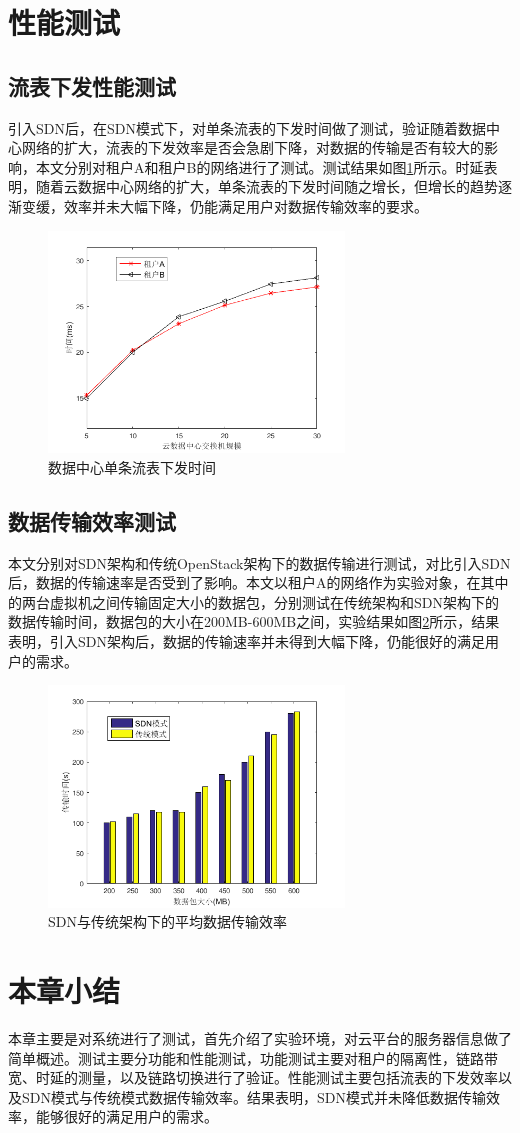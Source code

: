 \section{性能测试}
\subsection{流表下发性能测试}
引入SDN后，在SDN模式下，对单条流表的下发时间做了测试，验证随着数据中心网络的扩大，流表的下发效率是否会急剧下降，对数据的传输是否有较大的影响，本文分别对租户A和租户B的网络进行了测试。测试结果如图\ref{fig:flow-time}所示。时延表明，随着云数据中心网络的扩大，单条流表的下发时间随之增长，但增长的趋势逐渐变缓，效率并未大幅下降，仍能满足用户对数据传输效率的要求。

\begin{figure}[!htb]
  \centering
  \includegraphics[width=0.7\textwidth,height=0.40\textwidth]{logo/flow-time}
  \caption{数据中心单条流表下发时间}
  \label{fig:flow-time}
\end{figure}
\subsection{数据传输效率测试}
本文分别对SDN架构和传统OpenStack架构下的数据传输进行测试，对比引入SDN后，数据的传输速率是否受到了影响。本文以租户A的网络作为实验对象，在其中的两台虚拟机之间传输固定大小的数据包，分别测试在传统架构和SDN架构下的数据传输时间，数据包的大小在200MB-600MB之间，实验结果如图\ref{fig:transmission}所示，结果表明，引入SDN架构后，数据的传输速率并未得到大幅下降，仍能很好的满足用户的需求。
\begin{figure}[!htb]
  \centering
  \includegraphics[width=0.7\textwidth,height=0.40\textwidth]{logo/transmission}
  \caption{SDN与传统架构下的平均数据传输效率}
  \label{fig:transmission}
\end{figure}
\section{本章小结}
本章主要是对系统进行了测试，首先介绍了实验环境，对云平台的服务器信息做了简单概述。测试主要分功能和性能测试，功能测试主要对租户的隔离性，链路带宽、时延的测量，以及链路切换进行了验证。性能测试主要包括流表的下发效率以及SDN模式与传统模式数据传输效率。结果表明，SDN模式并未降低数据传输效率，能够很好的满足用户的需求。